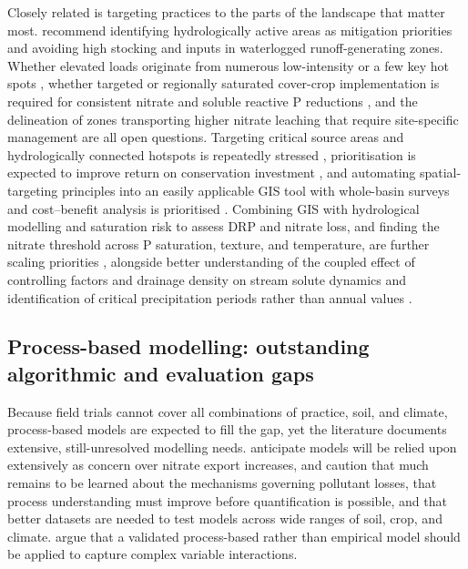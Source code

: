 Closely related is targeting practices to the parts of the landscape that matter most. \textcite{Melland2008} recommend identifying hydrologically active areas as mitigation priorities and avoiding high stocking and inputs in waterlogged runoff-generating zones. Whether elevated loads originate from numerous low-intensity or a few key hot spots \parencite{Irvine2019}, whether targeted or regionally saturated cover-crop implementation is required for consistent nitrate and soluble reactive P reductions \parencite{Speir2022}, and the delineation of zones transporting higher nitrate leaching that require site-specific management \parencite{Bakhsh2005b} are all open questions. Targeting critical source areas and hydrologically connected hotspots is repeatedly stressed \parencite{Baulch2019,McDowell2015,Brendel2019}, prioritisation is expected to improve return on conservation investment \parencite{Makhtoumi2025}, and automating spatial-targeting principles into an easily applicable GIS tool with whole-basin surveys and cost--benefit analysis is prioritised \parencite{Kvítek2023}. Combining GIS with hydrological modelling and saturation risk to assess DRP and nitrate loss, and finding the nitrate threshold across P saturation, texture, and temperature, are further scaling priorities \parencite{Smith2023}, alongside better understanding of the coupled effect of controlling factors and drainage density on stream solute dynamics \parencite{Kennedy2012} and identification of critical precipitation periods rather than annual values \parencite{Salo2006}.

\subsection{Process-based modelling: outstanding algorithmic and evaluation gaps}

Because field trials cannot cover all combinations of practice, soil, and climate, process-based models are expected to fill the gap, yet the literature documents extensive, still-unresolved modelling needs. \textcite{Du2017} anticipate models will be relied upon extensively as concern over nitrate export increases, and \textcite{SKAGGS1994} caution that much remains to be learned about the mechanisms governing pollutant losses, that process understanding must improve before quantification is possible, and that better datasets are needed to test models across wide ranges of soil, crop, and climate. \textcite{Smith2008} argue that a validated process-based rather than empirical model should be applied to capture complex variable interactions.

